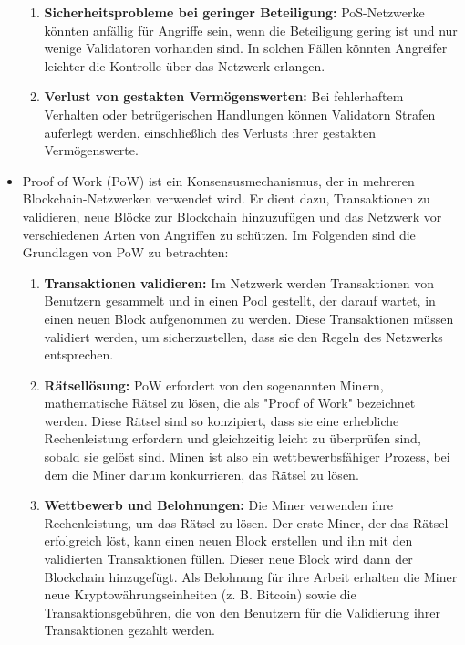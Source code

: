 \begin{itemize}
\begin{enumerate}
		\item \textbf{Sicherheitsprobleme bei geringer Beteiligung:} PoS-Netzwerke könnten anfällig für Angriffe sein, wenn die Beteiligung gering ist und nur wenige Validatoren vorhanden sind. In solchen Fällen könnten Angreifer leichter die Kontrolle über das Netzwerk erlangen.
		
		\item \textbf{Verlust von gestakten Vermögenswerten:} Bei fehlerhaftem Verhalten oder betrügerischen Handlungen können Validatorn Strafen auferlegt werden, einschließlich des Verlusts ihrer gestakten Vermögenswerte.
	\end{enumerate}
	\newpage
	\item Proof of Work (PoW) ist ein Konsensusmechanismus, der in mehreren Blockchain-Netzwerken verwendet wird. Er dient dazu, Transaktionen zu validieren, neue Blöcke zur Blockchain hinzuzufügen und das Netzwerk vor verschiedenen Arten von Angriffen zu schützen. Im Folgenden sind die Grundlagen von PoW zu betrachten:
	
	\begin{enumerate}[label=\arabic*.]
		\item \textbf{Transaktionen validieren:} Im Netzwerk werden Transaktionen von Benutzern gesammelt und in einen Pool gestellt, der darauf wartet, in einen neuen Block aufgenommen zu werden. Diese Transaktionen müssen validiert werden, um sicherzustellen, dass sie den Regeln des Netzwerks entsprechen.
		
		\item \textbf{Rätsellösung:} PoW erfordert von den sogenannten Minern, mathematische Rätsel zu lösen, die als "Proof of Work" bezeichnet werden. Diese Rätsel sind so konzipiert, dass sie eine erhebliche Rechenleistung erfordern und gleichzeitig leicht zu überprüfen sind, sobald sie gelöst sind. Minen ist also ein wettbewerbsfähiger Prozess, bei dem die Miner darum konkurrieren, das Rätsel zu lösen.
		
		\item \textbf{Wettbewerb und Belohnungen:} Die Miner verwenden ihre Rechenleistung, um das Rätsel zu lösen. Der erste Miner, der das Rätsel erfolgreich löst, kann einen neuen Block erstellen und ihn mit den validierten Transaktionen füllen. Dieser neue Block wird dann der Blockchain hinzugefügt. Als Belohnung für ihre Arbeit erhalten die Miner neue Kryptowährungseinheiten (z. B. Bitcoin) sowie die Transaktionsgebühren, die von den Benutzern für die Validierung ihrer Transaktionen gezahlt werden.
		

\end{enumerate}
\end{itemize}

